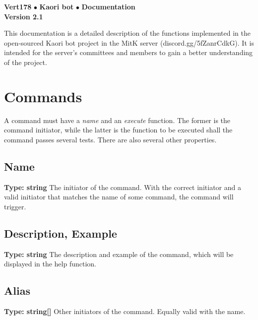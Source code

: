 \documentclass[11pt]{article}
\begin{document}
\thispagestyle{firstpage}

\begin{center}
\begin{large}
{\textnormal{\bf 
Vert178
}\hspace{2.5pt}$\bullet$\hspace{7pt}\textnormal{\bf 
Kaori bot
}\hspace{2.5pt}$\bullet$\hspace{7pt}\textnormal{\bf 
Documentation
}}\\
\smallskip
\bf{Version 2.1
}\\
\smallskip

\hrulefill
\end{large}
\end{center}

This documentation is a detailed description of the functions implemented in the open-sourced Kaori bot project in the MitK server (discord.gg/5fZanrCdkG). It is intended for the server's committees and members to gain a better understanding of the project.

\tableofcontents



\newpage

\section{Commands}
A command must have a \emph{name} and an \emph{execute} function. The former is the command initiator, while the latter is the function to be executed shall the command passes several tests. There are also several other properties.

\subsection{Name}
\textbf{Type: string} \hspace{5pt} The initiator of the command. With the correct initiator and a valid initiator that matches the name of some command, the command will trigger.

\subsection{Description, Example}
\textbf{Type: string} \hspace{5pt} The description and example of the command, which will be displayed in the help function.

\subsection{Alias}
\textbf{Type: string[]} \hspace{5pt} Other initiators of the command. Equally valid with the name.
\end{document}
